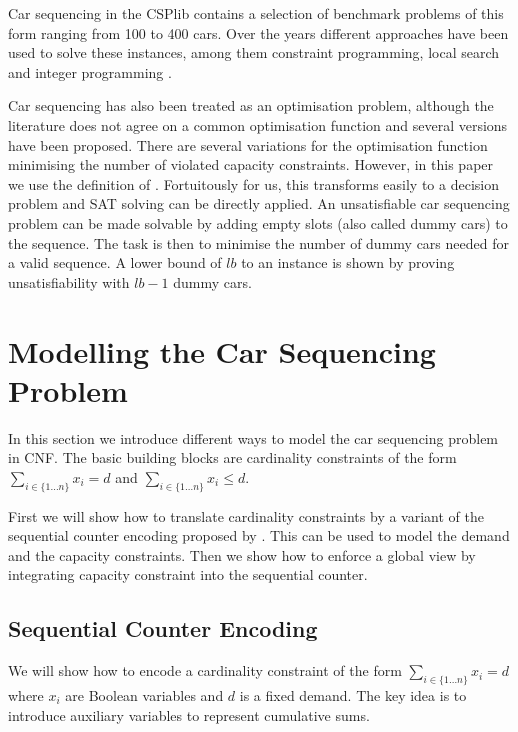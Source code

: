 \documentclass[]{llncs}
\begin{document}
Car sequencing in the CSPlib contains a selection of benchmark problems of this form ranging from 100 to 400 cars. Over
the years different approaches have been used to solve these instances, among them constraint programming, local search
and integer programming \cite{Regin97}\cite{Gottlieb03}\cite{Gravel05}\cite{Estellon06}\cite{Siala12}.

Car sequencing has also been treated as an optimisation problem, although the literature does not agree on a common
optimisation function and several versions have been proposed. There are several variations for the optimisation
function minimising the number of violated capacity constraints.  However, in this paper we use the definition of
\cite{Perron04}. Fortuitously for us, this transforms easily to a decision problem and SAT solving can be directly
applied.  An unsatisfiable car sequencing problem can be made solvable by adding empty slots (also called dummy cars) to
the sequence. The task is then to minimise the number of dummy cars needed for a valid sequence. A lower bound of $lb$
to an instance is shown by proving unsatisfiability with $lb-1$ dummy cars.

\section{Modelling the Car Sequencing Problem}
\label{sec:modelling}

In this section we introduce different ways to model the car sequencing problem in CNF. The basic building blocks are
cardinality constraints of the form $\sum_{i\in \{1\ldots n\}} x_{i} = d$ and $ \sum_{i\in \{1\ldots n\}} x_{i} \leq d
$.

First we will show how to translate cardinality constraints by a variant of the sequential counter encoding proposed by
\cite{Sinz05}. This can be used to model the demand and the capacity constraints. Then we show how to enforce a global
view by integrating capacity constraint into the sequential counter. 

\subsection{Sequential Counter Encoding}

We will show how to encode a cardinality constraint of the form $ \sum_{i\in \{1\ldots n\}} x_{i} = d $ where $x_i$ are
Boolean variables and $d$ is a fixed demand. The key idea is to introduce auxiliary variables to represent cumulative
sums.
\end{document}

